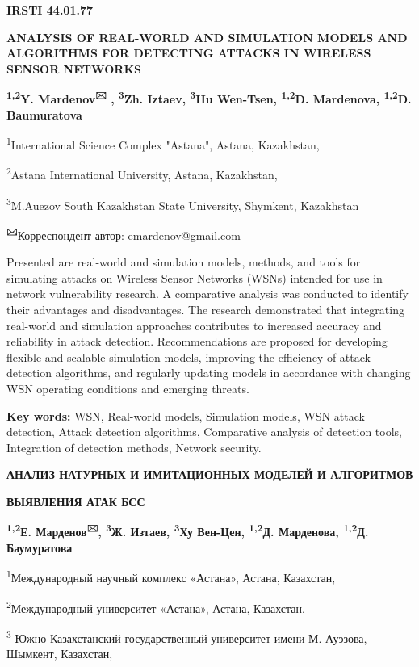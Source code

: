 
\newpage
{\bfseries IRSTI 44.01.77}

{\bfseries ANALYSIS OF REAL-WORLD AND SIMULATION MODELS AND ALGORITHMS FOR
DETECTING ATTACKS IN WIRELESS SENSOR NETWORKS}

{\bfseries \textsuperscript{1,2}Y. Mardenov\textsuperscript{🖂} ,
\textsuperscript{3}Zh. Iztaev, \textsuperscript{3}Hu Wen-Tsen,
\textsuperscript{1,2}D. Mardenova, \textsuperscript{1,2}D. Baumuratova}

\textsuperscript{1}International Science Complex "Astana", Astana,
Kazakhstan,

\textsuperscript{2}Astana International University, Astana, Kazakhstan,

\textsuperscript{3}M.Auezov South Kazakhstan State University, Shymkent,
Kazakhstan

{\bfseries \textsuperscript{🖂}}Корреспондент-автор: emardenov@gmail.com

Presented are real-world and simulation models, methods, and tools for
simulating attacks on Wireless Sensor Networks (WSNs) intended for use
in network vulnerability research. A comparative analysis was conducted
to identify their advantages and disadvantages. The research
demonstrated that integrating real-world and simulation approaches
contributes to increased accuracy and reliability in attack detection.
Recommendations are proposed for developing flexible and scalable
simulation models, improving the efficiency of attack detection
algorithms, and regularly updating models in accordance with changing
WSN operating conditions and emerging threats.

{\bfseries Key words:} WSN, Real-world models, Simulation models, WSN
attack detection, Attack detection algorithms, Comparative analysis of
detection tools, Integration of detection methods, Network security.

{\bfseries АНАЛИЗ НАТУРНЫХ И ИМИТАЦИОННЫХ МОДЕЛЕЙ И АЛГОРИТМОВ}

{\bfseries ВЫЯВЛЕНИЯ АТАК БСС}

{\bfseries \textsuperscript{1,2}Е. Марденов\textsuperscript{🖂},
\textsuperscript{3}Ж. Изтаев, \textsuperscript{3}Ху Вен-Цен,
\textsuperscript{1,2}Д. Марденова, \textsuperscript{1,2}Д. Баумуратова}

\textsuperscript{1}Международный научный комплекс «Астана», Астана,
Казахстан,

\textsuperscript{2}Международный университет «Астана», Астана,
Казахстан,

\textsuperscript{3} Южно-Казахстанский государственный университет имени
М. Ауэзова, Шымкент, Казахстан,

